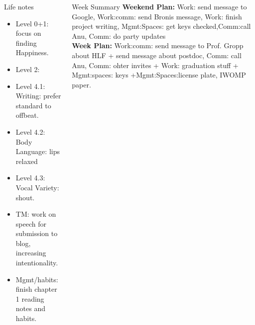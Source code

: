 \documentclass[serif, mathserif, final]{beamer}
\begin{document}
\begin{frame}{}
\begin{columns}
\begin{column}{0.25\linewidth}
  \begin{block}{Life notes} 
    \begin{itemize} 
      \tiny \item \tiny Level 0+1: focus on finding Happiness. 
    \item \tiny Level 2: 
    \item \tiny Level 4.1: Writing: prefer standard to offbeat. 
    \item \tiny Level 4.2: Body Language: lips relaxed
    \item \tiny Level 4.3: Vocal Variety: shout. 
    \item \tiny TM: work on speech for submission to blog, increasing intentionality. 
    \item \tiny Mgmt/habits: finish chapter 1 reading notes and habits. 
    \end{itemize}     
  \end{block}
    \end{column} %
    
\begin{column}{0.50\linewidth}
  \begin{block}{Week Summary}
    {\tiny \textbf{Weekend Plan:} Work: send message to Google, Work:comm:
    send Bronis message,  Work: finish project writing, Mgmt:Spaces:
    get keys checked,Comm:call Anu, Comm: do party updates }\\
    {\tiny \textbf{Week Plan:} Work:comm: send message to Prof. Gropp about
    HLF + send message about postdoc, Comm: call Anu, Comm: ohter
    invites +  Work: graduation stuff + Mgmt:spaces: keys +Mgmt:Spaces:license plate, IWOMP paper.}\\
  \end{block}


\end{column}
\end{columns}
\end{frame}
\end{document}

